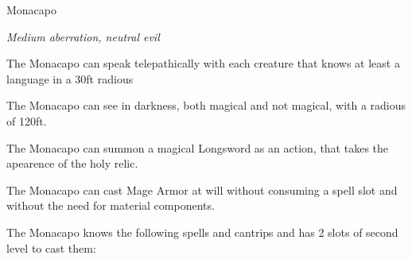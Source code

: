 \documentclass[10pt,twoside, twocolumn, openany]{dndbook}
\begin{document}
\begin{monsterbox}{Monacapo}
  \begin{hangingpar}
    \textit{Medium aberration, neutral evil}
  \end{hangingpar}
  \dndline%
  \basics[%
  armorclass = 11 (natural) (13 with \emph{mage armor}),
  hitpoints  = \dice{3d8 + 9},
  speed      = {30 ft.},
  ]
  \dndline%
  \stats[
    STR = \stat{14}, %
    DEX = \stat{11},
    CON = \stat{16},
    INT = \stat{10},
    WIS = \stat{15},
    CHA = \stat{14},
  ]
  \dndline%
  \details[%
    senses = {darkvision 60 ft., passive Perception 12},
    languages = {Common, Deep Speech},
    challenge = {2},
  ]
  \dndline%

  \begin{monsteraction}[Telepathy]
    The Monacapo can speak telepathically with each creature that knows at least a language in a 30ft radious
  \end{monsteraction}

  \begin{monsteraction}
    The Monacapo can see in darkness, both magical and not magical, with a radious of 120ft.
   \end{monsteraction}

  \begin{monsteraction}
    The Monacapo can summon a magical Longsword as an action, that takes the apearence of the holy relic.
  \end{monsteraction}

  \begin{monsteraction}
    The Monacapo can cast Mage Armor at will without consuming a spell slot and without the need for material components.
  \end{monsteraction}

  \begin{monsteraction}[Spellcasting]
    The Monacapo knows the following spells and cantrips and has 2 slots of second level to cast them:
    

\end{monsteraction}
\end{monsterbox}
\end{document}

